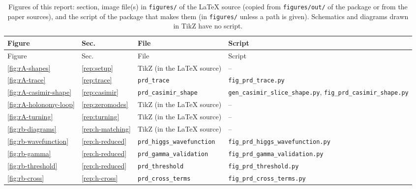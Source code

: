 {\small
\begin{longtable}{@{}>{\raggedright\arraybackslash}p{}>{\raggedright\arraybackslash}p{}>{\raggedright\arraybackslash}p{}>{\raggedright\arraybackslash}p{}@{}}
\caption{Figures of this report: section, image file(s) in \texttt{figures/} of the LaTeX source (copied from \texttt{figures/out/} of the package or from the paper sources), and the script of the package that makes them (in \texttt{figures/} unless a path is given). Schematics and diagrams drawn in TikZ have no script.}\label{tab:v22-figures}\\
\toprule Figure & Sec. & File & Script \\ \midrule\endfirsthead
\toprule Figure & Sec. & File & Script \\ \midrule\endhead
\bottomrule\endlastfoot
\ref{fig:rA-shapes} & \ref{rep:setup} & TikZ (in the LaTeX source) & -- \\
\ref{fig:rA-trace} & \ref{rep:trace} & \texttt{prd\_\allowbreak{}trace} & \texttt{fig\_\allowbreak{}prd\_\allowbreak{}trace.py} \\
\ref{fig:rA-casimir-shape} & \ref{rep:casimir} & \texttt{prd\_\allowbreak{}casimir\_\allowbreak{}shape} & \texttt{gen\_\allowbreak{}casimir\_\allowbreak{}slice\_\allowbreak{}shape.py}, \texttt{fig\_\allowbreak{}prd\_\allowbreak{}casimir\_\allowbreak{}shape.py} \\
\ref{fig:rA-holonomy-loop} & \ref{rep:zeromodes} & TikZ (in the LaTeX source) & -- \\
\ref{fig:rA-turning} & \ref{rep:turning} & TikZ (in the LaTeX source) & -- \\
\ref{fig:rb-diagrams} & \ref{rep:h-matching} & TikZ (in the LaTeX source) & -- \\
\ref{fig:rb-wavefunction} & \ref{rep:h-reduced} & \texttt{prd\_\allowbreak{}higgs\_\allowbreak{}wavefunction} & \texttt{fig\_\allowbreak{}prd\_\allowbreak{}higgs\_\allowbreak{}wavefunction.py} \\
\ref{fig:rb-gamma} & \ref{rep:h-reduced} & \texttt{prd\_\allowbreak{}gamma\_\allowbreak{}validation} & \texttt{fig\_\allowbreak{}prd\_\allowbreak{}gamma\_\allowbreak{}validation.py} \\
\ref{fig:rb-threshold} & \ref{rep:h-reduced} & \texttt{prd\_\allowbreak{}threshold} & \texttt{fig\_\allowbreak{}prd\_\allowbreak{}threshold.py} \\
\ref{fig:rb-cross} & \ref{rep:h-cross} & \texttt{prd\_\allowbreak{}cross\_\allowbreak{}terms} & \texttt{fig\_\allowbreak{}prd\_\allowbreak{}cross\_\allowbreak{}terms.py} \\

\end{longtable}}
